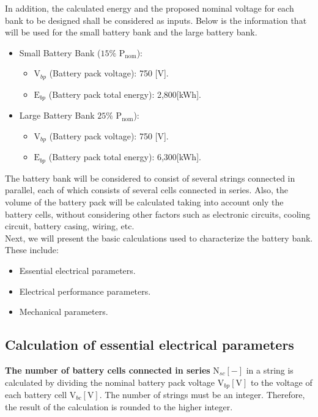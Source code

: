 In addition, the calculated energy and the proposed nominal voltage for each bank to be designed shall be considered as inputs. Below is the information that will be used for the small battery bank and the large battery bank.

\begin{itemize}
	\item Small Battery Bank ($15\%$ ${\text{P}}_{\text{nom}}$):
	\begin{itemize}
		\item $\text{V}_{bp}$ (Battery pack voltage): 750 [V].
		\item  $\text{E}_{bp}$ (Battery pack total energy): 2,800[kWh].
	\end{itemize}
	\item Large Battery Bank $25\%$ ${\text{P}}_{\text{nom}}$):
	\begin{itemize}
		\item $\text{V}_{bp}$ (Battery pack voltage): 750 [V].
		\item  $\text{E}_{bp}$ (Battery pack total energy): 6,300[kWh].
	\end{itemize}
\end{itemize}

The battery bank will be considered to consist of several strings connected in parallel, each of which consists of several cells connected in series. Also, the volume of the battery pack will be calculated taking into account only the battery cells, without considering other factors such as electronic circuits, cooling circuit, battery casing, wiring, etc.\\

Next, we will present the basic calculations used to characterize the battery bank. These include:

\begin{itemize}
	\item Essential electrical parameters.
	\item Electrical performance parameters.
	\item Mechanical parameters.
\end{itemize}


\subsection{Calculation of essential electrical parameters}

\textbf{The number of battery cells connected in series} $\text{N}_{sc} [-]$ in a string is calculated by dividing the nominal battery pack voltage $\text{V}_{bp} [\text{V}]$ to the voltage of each battery cell $\text{V}_{bc} [\text{V}]$. The number of strings must be an integer. Therefore, the result of the calculation is rounded to the higher integer.

